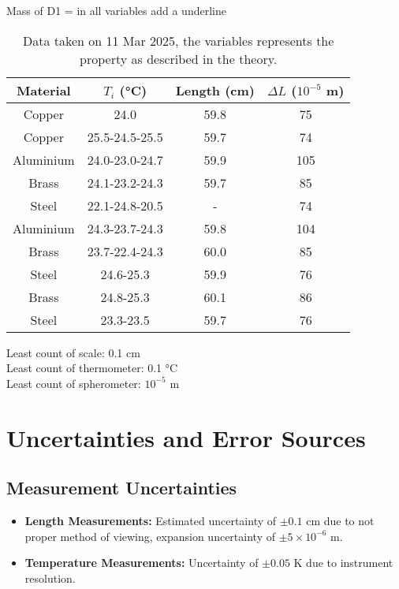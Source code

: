 \documentclass[%
 sor,
 jor,
 amsmath,amssymb,
 reprint,
]{revtex4-2}
\begin{document}
\begin{table}[h]
\centering

Mass of D1 = %
in all variables add a underline



\begin{tabular}{|c|ccc|}
    \hline
    Material & $T_i$ (\si{\celsius})  & Length (cm) & $\Delta L$ ($10^{-5}$ m)\\
    \hline
    Copper 	& 24.0     & 59.8 & 75 \\
    Copper 	& 25.5-24.5-25.5 & 59.7 & 74\\
    Aluminium 	& 24.0-23.0-24.7 & 59.9 & 105\\
    Brass 	& 24.1-23.2-24.3 & 59.7 & 85 \\
    Steel 	& 22.1-24.8-20.5 & - & 74 \\
    Aluminium 	& 24.3-23.7-24.3 & 59.8 & 104\\
    Brass 	& 23.7-22.4-24.3 & 60.0 & 85 \\
    Steel 	& 24.6-25.3 & 59.9 & 76 \\
    Brass	& 24.8-25.3 & 60.1 & 86 \\
    Steel 	& 23.3-23.5 & 59.7 & 76 \\ 
    \hline
\end{tabular}
\caption{Data taken on 11 Mar 2025, the variables represents the property as described in the theory.}
\end{table}
Least count of scale: 0.1 cm  \\
Least count of thermometer: 0.1 $\si{\celsius}$ \\
Least count of spherometer: $10^{-5}$ m  \\


\section{Uncertainties and Error Sources}
\subsection{Measurement Uncertainties}
\begin{itemize}
    \item \textbf{Length Measurements:} Estimated uncertainty of $\pm 0.1$ cm due to not proper method of viewing, expansion uncertainty of $\pm 5\times 10^{-6}$ m.
    \item \textbf{Temperature Measurements:} Uncertainty of $\pm 0.05$ \si{\kelvin} due to instrument resolution.
\end{itemize}
\end{document}
